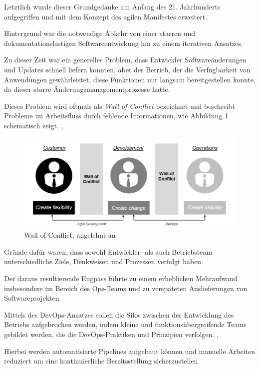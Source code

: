 Letztlich wurde dieser Grundgedanke am Anfang des 21. Jahrhunderts aufgegriffen und mit dem Konzept des agilen Manifestes erweitert.

Hintergrund war die notwendige Abkehr von einer starren und dokumentationslastigen Softwareentwickung hin zu einem iterativen Ansatzes. \cite[S.4]{sharma_devops_2017}  

Zu dieser Zeit war ein generelles Problem, dass Entwickler Softwareänderungen und Updates schnell liefern konnten, aber der Betrieb, der die Verfügbarkeit von Anwendungen gewährleistet, diese Funktionen nur langsam bereitgestellen konnte, da dieser starre Änderungsmanagementprozesse hatte.

Dieses Problem wird oftmals als \textit{Wall of Conflict} bezeichnet und beschreibt Probleme im Arbeitsfluss durch fehlende Informationen, wie Abbildung 1 schematisch zeigt. \cite{kawaguchi_wall_2020}, \cite[S. 26]{huttermann_devops_2012} 

\begin{figure}[h]
    \centering
    \includegraphics[scale=0.6]{Bilder/Wall of Conflict.png}
    \caption{Wall of Conflict, angelehnt an \cite{hering_devops_2018}}
\end{figure}

Gründe dafür waren, dass sowohl Entwickler- als auch Betriebsteam unterschiedliche Ziele, Denkweisen und Prozessen verfolgt haben. \cite{wettinger_streamlining_2016} 

Der daraus resultierende Engpass führte zu einem erheblichen Mehraufwand insbesondere im Bereich des Ops-Teams und zu verspäteten Auslieferungen von Softwareprojekten.

Mittels des DevOps-Ansatzes sollen die Silos zwischen der Entwicklung des Betriebs aufgebrochen werden, indem kleine und funktionsübergreifende Teams gebildet werden, die die DevOps-Praktiken und Prinzipien verfolgen. \cite{ebert_devops_2016}, \cite{wiedemann_research_2019}  

Hierbei werden automatisierte Pipelines aufgebaut können und manuelle Arbeiten reduziert um eine kontinuierliche Bereitsstellung sicherzustellen. \cite[S.3,5]{verona_practical_2016}

